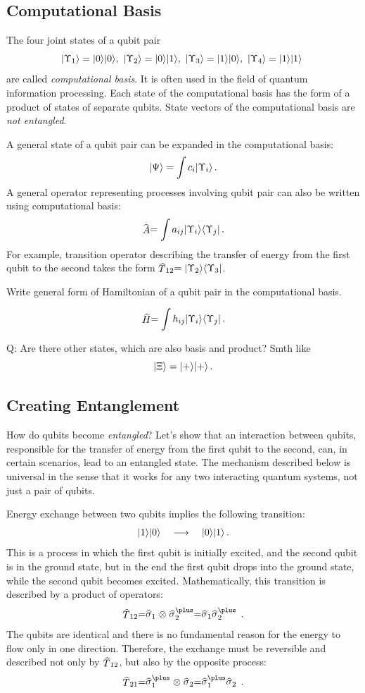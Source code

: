 \subsection{Computational Basis}
The four joint states of a qubit pair
\[
|{\Upsilon_1}\rangle = |{0}\rangle|{0}\rangle,\,\,|{\Upsilon_2}\rangle = |{0}\rangle|{1}\rangle,\,\,
|{\Upsilon_3}\rangle = |{1}\rangle|{0}\rangle,\,\,|{\Upsilon_4}\rangle = |{1}\rangle|{1}\rangle\
\]
are called \emph{computational basis}. It is often used in the field of quantum information processing.
Each state of the computational basis has the form of a product of states of separate qubits. State vectors of the computational basis are \emph{not entangled}.

A general state of a qubit pair can be expanded in the computational basis:
\[
|{\Psi}\rangle = \int c_i|{\Upsilon_i}\rangle\,.
\]
A general operator representing processes involving qubit pair can also be written using computational basis:
\[
	\op{A}=\int a_{ij}\ketbra{\Upsilon_i}{\Upsilon_j}\,.
\]
For example, transition operator describing the transfer of energy from the first qubit to the second takes the form $\op{T}_{12}=\ketbra{\Upsilon_2}{\Upsilon_3}$.

\begin{exercise}
	Write general form of Hamiltonian of a qubit pair in the computational basis. 
	
	\[
	\op{H}=\int h_{ij}\ketbra{\Upsilon_i}{\Upsilon_j}\,.
	\]
\end{exercise}

Q: Are there other states, which are also basis and product? Smth like
\[
|{\Xi}\rangle=|{+}\rangle|{+}\rangle\,.
\]

\subsection{Creating Entanglement}
How do qubits become \emph{entangled}? Let's show that an interaction between qubits, responsible for the transfer of energy from the first qubit to the second, can, in certain scenarios, lead to an entangled state. The mechanism described below is universal in the sense that it works for any two interacting quantum systems, not just a pair of qubits.

Energy exchange between two qubits implies the following transition:
\[
|{1}\rangle|{0}\rangle\quad\longrightarrow\quad|{0}\rangle|{1}\rangle\,.
\]
This is a process in which the first qubit is initially excited, and the second qubit is in the ground state, but in the end the first qubit drops into the ground state, while the second qubit becomes excited. Mathematically, this transition is described by a product of operators:
\[
\op{T}_{12} = \op{\sigma}_1\otimes \op{\sigma}^\plus_2 = \op{\sigma}_1\op{\sigma}^\plus_2\,.
\]
The qubits are identical and there is no fundamental reason for the energy to flow only in one direction. Therefore, the exchange must be reversible and described not only by $\op{T}_{12}$, but also by the opposite process:
\[
\op{T}_{21} = \op{\sigma}^\plus_1\otimes \op{\sigma}_2 = \op{\sigma}^\plus_1\op{\sigma}_2\,.
\]

